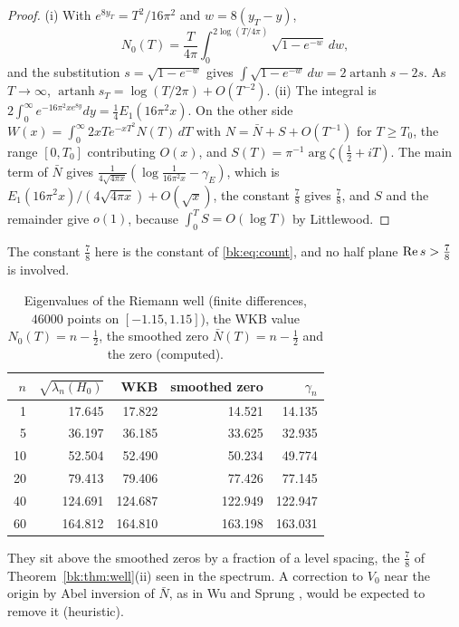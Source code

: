 \begin{proof}
\textup{(i)} With $e^{8y_T}=T^2/16\pi^2$ and $w=8(y_T-y)$,
\[N_0(T)=\frac{T}{4\pi}\int_0^{2\log(T/4\pi)}\sqrt{1-e^{-w}}\,dw,\]
and the substitution $s=\sqrt{1-e^{-w}}$ gives $\int\sqrt{1-e^{-w}}\,dw=2\operatorname{artanh}s-2s$. As $T\to\infty$, $\operatorname{artanh}s_T=\log(T/2\pi)+O(T^{-2})$. \textup{(ii)} The integral is $2\int_0^\infty e^{-16\pi^2xe^{8y}}dy=\frac14E_1(16\pi^2x)$. On the other side $W(x)=\int_0^\infty2xTe^{-xT^2}N(T)\,dT$ with $N=\bar N+S+O(T^{-1})$ for $T\ge T_0$, the range $[0,T_0]$ contributing $O(x)$, and $S(T)=\pi^{-1}\arg\zeta(\frac12+iT)$. The main term of $\bar N$ gives $\frac1{4\sqrt{4\pi x}}(\log\frac1{16\pi^2x}-\gamma_E)$, which is $E_1(16\pi^2x)/(4\sqrt{4\pi x})+O(\sqrt x)$, the constant $\frac78$ gives $\frac78$, and $S$ and the remainder give $o(1)$, because $\int_0^TS=O(\log T)$ by Littlewood.
\end{proof}

The constant $\frac78$ here is the constant of \eqref{bk:eq:count}, and no half plane $\operatorname{Re} s>\frac78$ is involved.

\begin{table}[ht]
\centering
\small
\begin{tabular}{rrrrr}
\toprule
$n$ & $\sqrt{\lambda_n(H_0)}$ & WKB & smoothed zero & $\gamma_n$\\
\midrule
1 & 17.645 & 17.822 & 14.521 & 14.135\\
5 & 36.197 & 36.185 & 33.625 & 32.935\\
10 & 52.504 & 52.490 & 50.234 & 49.774\\
20 & 79.413 & 79.406 & 77.426 & 77.145\\
40 & 124.691 & 124.687 & 122.949 & 122.947\\
60 & 164.812 & 164.810 & 163.198 & 163.031\\
\bottomrule
\end{tabular}
\caption{Eigenvalues of the Riemann well (finite differences, $46000$ points on $[-1.15,1.15]$), the WKB value $N_0(T)=n-\frac12$, the smoothed zero $\bar N(T)=n-\frac12$ and the zero (computed).}\label{bk:tab:well}
\end{table}

They sit above the smoothed zeros by a fraction of a level spacing, the $\frac78$ of Theorem~\ref{bk:thm:well}\textup{(ii)} seen in the spectrum. A correction to $V_0$ near the origin by Abel inversion of $\bar N$, as in Wu and Sprung \cite{NCKolWuSprung93}, would be expected to remove it (heuristic).

